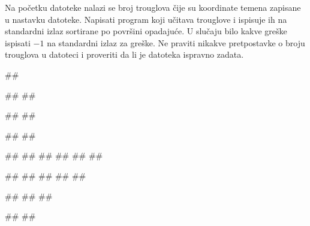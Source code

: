 \begin{Exercise}[label=A_05]
Na početku datoteke  nalazi se broj trouglova čije su koordinate temena zapisane u nastavku datoteke. Napisati
  program koji učitava trouglove i ispisuje ih na standardni izlaz
  sortirane po površini opadajuće. U slučaju bilo kakve greške ispisati $-1$ na standardni izlaz za greške. Ne praviti nikakve pretpostavke o broju trouglova u datoteci i proveriti da li je datoteka ispravno zadata. 

\begin{miditest}
\begin{test}{3}
##

#\naslovIzlazZaGresku#
##
\end{test}
\end{miditest}
\begin{minitest}
\begin{test}{4}
##
##

#\naslovIzlaz#
#\izlaz{}#
\end{test}
\end{minitest}

\begin{miditest}
\begin{test}{1}
##
##
##
##
##
##

#\naslovIzlaz#
##
##
##
##
\end{test}
\end{miditest}
\begin{minitest}
\begin{test}{2}
##
##
##

#\naslovIzlazZaGresku#
##
\end{test}
\end{minitest}


\end{Exercise}

\begin{Answer}[ref=A_05]
\ifpdf \else \newpage \fi
\end{Answer}

